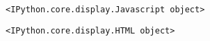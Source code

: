     
    \begin{verbatim}
<IPython.core.display.Javascript object>
    \end{verbatim}

    
    
    \begin{verbatim}
<IPython.core.display.HTML object>
    \end{verbatim}

    

    
    
    

